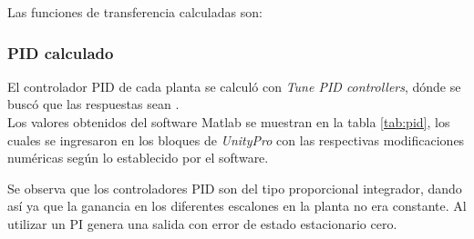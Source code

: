 Las funciones de transferencia calculadas son:

\subsubsection{PID calculado}
El controlador PID de cada planta se calculó con \textit{Tune PID controllers}, dónde se buscó que las respuestas sean .\\
Los valores obtenidos del software Matlab se muestran en la tabla \ref{tab:pid}, los cuales se ingresaron en los bloques de \textit{UnityPro} con las respectivas modificaciones numéricas según lo establecido por el software.


Se observa que los controladores PID son del tipo proporcional integrador, dando así ya que la ganancia en los diferentes escalones en la planta no era constante. Al utilizar un PI genera una salida con error de estado estacionario cero. 

\begin{comment}
\fcolorbox{red}{yellow}{Estuve viendo las curvas con escalones donde se ve que la ganancia estática se modifica frente a diferentes escalones. Si el objetivo fuese calcular un controlador para ese sistema una buena opción seria un controlador PI. De esta forma, la acción integral va a tratar de hacer que el error de estado estacionario sea cero frente a una entrada escalón. Además, los problemas que pueden existir en el envejecimiento de componentes, errores en el modelado y variaciones en la ganancia estática se van a mitigar con la parte integral del controlador. Obviamente al cambiar la planta la respuesta va a cambiar pero se va a cumplir la consigna de seguir la referencia. Para mostrar esto es posible calcular un controlador para un sistema y luego probar el controlador en los dos sistemas. Eso hice en el pdf que les adjunto con un sistema con 3 polos reales. Más detalles pueden encontrar en el libro de Ogata o Control avanzado de Karl Astrom, capitulo 3.
De esta forma, me da la sensación que para los objetivos de esta materia plantear un controlador PI para un controlador me parece bien.}
\end{comment}



